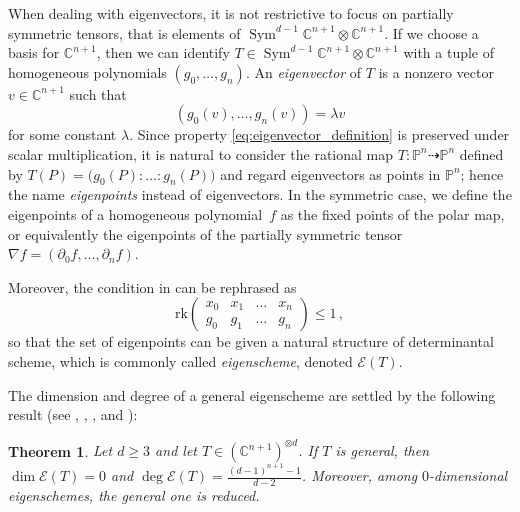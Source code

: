 \documentclass{amsart}
\theoremstyle{plain}
\newtheorem{theoremintro}{Theorem}
\theoremstyle{definition}
\newcommand{\C}{\mathbb{C}}
\newcommand{\p}{\mathbb{P}}
\newcommand{\de}{\partial}
\newcommand{\Eig}[1]{\mathcal{E}\!\left( {#1} \right)}
\newcommand{\Sym}{\operatorname{Sym}}
\newcommand{\rk}{\ensuremath{\mathrm{rk}}}
\begin{document}
When dealing with eigenvectors, it is not restrictive to focus on partially symmetric tensors, that is elements of $\Sym^{d-1}\C^{n+1}\otimes\C^{n+1}$.
 If we choose a basis for $\C^{n+1}$, then we can identify $T\in \Sym^{d-1}\C^{n+1}\otimes\C^{n+1}$ with a tuple of homogeneous polynomials $(g_0,\dots,g_n)$. An \emph{eigenvector} of $T$ is a nonzero vector $v\in\C^{n+1}$ such that
%
\begin{equation}
\label{eq:eigenvector_definition}
  (g_0(v), \ldots, g_n(v))=\lambda v
\end{equation}
%
for some constant $\lambda$.
Since %
property \eqref{eq:eigenvector_definition} is preserved under scalar multiplication, it is natural to consider the rational map $T \colon \p^n \dashrightarrow \p^n$ defined by $T(P)=\bigl(g_0(P): \ldots: g_n(P)\bigr)$ and regard eigenvectors as points in $\p^n$; hence the name \emph{eigenpoints} instead of eigenvectors. In the symmetric case, we define the eigenpoints of a homogeneous polynomial~$f$ as the fixed points of the polar map, or equivalently the eigenpoints of the partially symmetric tensor $\nabla f = (\de_0 f, \dotsc, \de_n f)$.

Moreover, the condition in  can be rephrased as 
\begin{equation}
\label{eq:def_matrix_general}
   \rk
   \begin{pmatrix}
     x_0 & x_1 & \dots & x_n \\
     g_0 & g_1 & \dots & g_n
   \end{pmatrix} \le 1 \,,
\end{equation}
so that the set of eigenpoints can be given a natural structure of determinantal scheme, which is commonly called \emph{eigenscheme}, denoted $\Eig{T}$.

The dimension and degree of a general eigenscheme are settled by the following result (see \cite[Theorem 2.1]{CartSturm}, \cite{ASS}, \cite{OO}, and \cite[Equation~5.2]{Abo}):

\begin{theoremintro}
\label{thm:nonempty}
Let $d \ge 3$ and let $T \in (\C^{n+1})^{\otimes d}$.
If $T$ is general, then $\dim \Eig{T}=0$ and $\deg \Eig{T}=\frac{(d-1)^{n+1}-1}{d-2}$.
Moreover, among $0$-dimensional eigenschemes, the general one is reduced.
\end{theoremintro}
\end{document}
